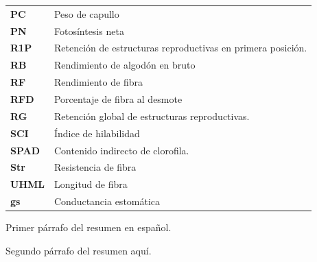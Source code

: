 \documentclass[12pt,oneside]{reedthesis}
\begin{document}
\begin{table}[h]
\begin{tabular}{ll}
                \textbf{PC} & Peso de capullo \\
                \textbf{PN} & Fotosíntesis neta \\
                \textbf{R1P} & Retención de estructuras reproductivas en primera posición. \\
                \textbf{RB} & Rendimiento de algodón en bruto \\
                \textbf{RF} & Rendimiento de fibra \\
                \textbf{RFD} & Porcentaje de fibra al desmote \\
                \textbf{RG} & Retención global de estructuras reproductivas. \\
                \textbf{SCI} & Índice de hilabilidad \\
                \textbf{SPAD} & Contenido indirecto de clorofila. \\
                \textbf{Str} & Resistencia de fibra \\
                \textbf{UHML} & Longitud de fibra \\
                \textbf{gs} & Conductancia estomática \\
            \end{tabular}
\end{table}
\thispagestyle{fancy} %
    \fancyhf{} %
    \fancyhead{} %
    \fancyfoot[R]{\thepage} %

  \begin{resumen}
    Primer párrafo del resumen en español.

    \par

    Segundo párrafo del resumen aquí.
    \thispagestyle{fancy} %
    \fancyhf{} %
    \fancyhead{} %
    \fancyfoot[R]{\thepage} %
  \end{resumen}

  \begin{abstract}
    Primer párrafo del resumen en inglés.

    \par

    Segundo párrafo del resumen aquí.
    \thispagestyle{fancy} %
    \fancyhf{} %
    \fancyhead{} %
    \fancyfoot[R]{\thepage} %
  \end{abstract}
\end{document}
